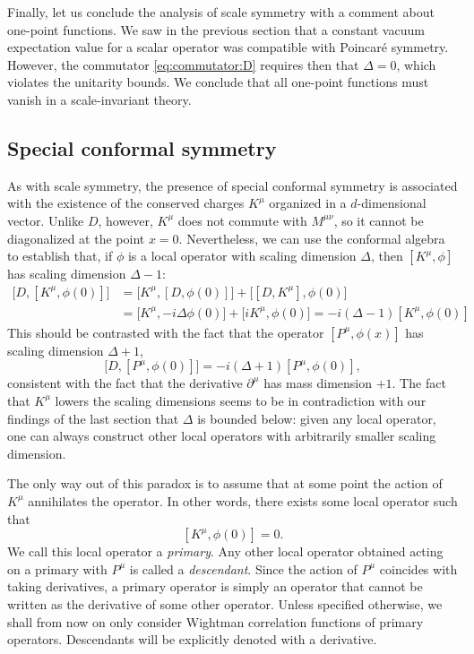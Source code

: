 \documentclass[a4paper,12pt]{article}
\numberwithin{equation}{section}
\begin{document}
Finally, let us conclude the analysis of scale symmetry with a comment about one-point functions. We saw in the previous section that a constant vacuum expectation value for a scalar operator was compatible with Poincaré symmetry. However, the commutator \eqref{eq:commutator:D} requires then that $\Delta = 0$, which violates the unitarity bounds.
We conclude that all one-point functions must vanish in a scale-invariant theory.


\subsection{Special conformal symmetry}

As with scale symmetry, the presence of special conformal symmetry is associated with the existence of the conserved charges $K^\mu$ organized in a $d$-dimensional vector.
Unlike $D$, however, $K^\mu$ does not commute with $M^{\mu\nu}$, so it cannot be diagonalized at the point $x = 0$.
Nevertheless, we can use the conformal algebra to establish that, if $\phi$ is a local operator with scaling dimension $\Delta$, then $\left[ K^\mu, \phi \right]$ has scaling dimension $\Delta - 1$:
\begin{align}
	\big[ D, [ K^\mu, \phi(0) ] \big]
	&= \big[ K^\mu, [ D, \phi(0) ] \big]
	+ \big[ [ D, K^\mu ], \phi(0) \big]
	\nonumber \\
	&= \big[ K^\mu, -i \Delta \phi(0) \big]
	+ \big[ i K^\mu, \phi(0) \big]
	= -i (\Delta - 1) [ K^\mu, \phi(0) ]
\end{align}
This should be contrasted with the fact that the operator $\left[P^\mu, \phi(x)\right]$ has scaling dimension $\Delta + 1$,
\begin{equation}
	\big[ D, [ P^\mu, \phi(0) ] \big]
	= -i (\Delta + 1) [ P^\mu, \phi(0) ],
\end{equation}
consistent with the fact that the derivative $\partial^\mu$ has mass dimension $+1$.
The fact that $K^\mu$ lowers the scaling dimensions seems to be in contradiction with our findings of the last section that $\Delta$ is bounded below: given any local operator, one can always construct other local operators with arbitrarily smaller scaling dimension.

The only way out of this paradox is to assume that at some point the action of $K^\mu$ annihilates the operator. In other words, there exists some local operator such that
\begin{equation}
	\left[ K^\mu, \phi(0) \right] = 0.
\end{equation}
We call this local operator a \emph{primary}. Any other local operator obtained acting on a primary with $P^\mu$ is called a \emph{descendant}. Since the action of $P^\mu$ coincides with taking derivatives, a primary operator is simply an operator that cannot be written as the derivative of some other operator.
Unless specified otherwise, we shall from now on only consider Wightman correlation functions of primary operators. Descendants will be explicitly denoted with a derivative.
\end{document}
